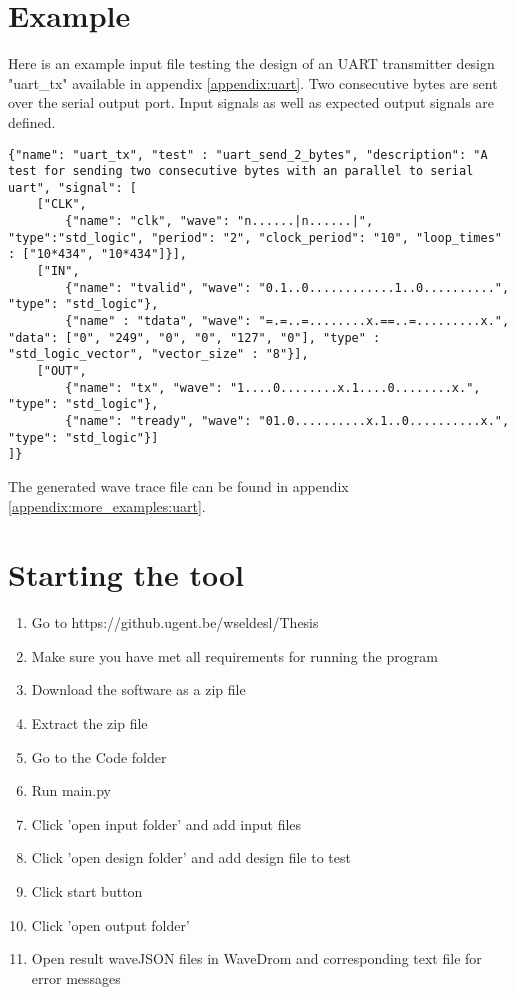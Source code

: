 \section{Example}
Here is an example input file testing the design of an UART transmitter design "uart\_tx" available in appendix \ref{appendix:uart}. Two consecutive bytes are sent over the serial output port. Input signals as well as expected output signals are defined.
\begin{lstlisting}[style=json, caption={}, label={}]
{"name": "uart_tx", "test" : "uart_send_2_bytes", "description": "A test for sending two consecutive bytes with an parallel to serial uart", "signal": [
	["CLK",
		{"name": "clk", "wave": "n......|n......|", "type":"std_logic", "period": "2", "clock_period": "10", "loop_times" : ["10*434", "10*434"]}],
	["IN",
		{"name": "tvalid", "wave": "0.1..0............1..0..........", "type": "std_logic"},
		{"name" : "tdata", "wave": "=.=..=........x.==..=.........x.", "data": ["0", "249", "0", "0", "127", "0"], "type" : "std_logic_vector", "vector_size" : "8"}],
	["OUT",
		{"name": "tx", "wave": "1....0........x.1....0........x.", "type": "std_logic"},
		{"name": "tready", "wave": "01.0..........x.1..0..........x.", "type": "std_logic"}]
]}
\end{lstlisting}
The generated wave trace file can be found in appendix \ref{appendix:more_examples:uart}.\newpage
\newpage
\section{Starting the tool}
\begin{enumerate}
	\item Go to https://github.ugent.be/wseldesl/Thesis
	\item Make sure you have met all requirements for running the program 
	\item Download the software as a zip file
	\item Extract the zip file
	\item Go to the Code folder
	\item Run main.py
	\item Click 'open input folder' and add input files
	\item Click 'open design folder' and add design file to test
	\item Click start button
	\item Click 'open output folder'
	\item Open result waveJSON files in WaveDrom and corresponding text file for error messages
\end{enumerate}

	

